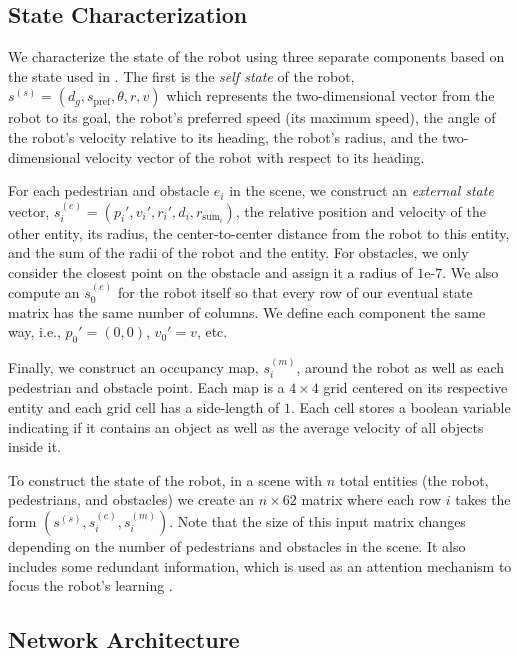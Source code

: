 \documentclass[letterpaper, 10 pt, conference]{ieeeconf}  %
\begin{document}
    \subsection{State Characterization}
    We characterize the state of the robot using three separate components based on the state used in \cite{crowdawarerl}. The first is the \textit{self state} of the robot, $s^{(s)}=(d_g, s_\text{pref}, \theta, r, v)$ which represents the two-dimensional vector from the robot to its goal, the robot's preferred speed (its maximum speed), the angle of the robot's velocity relative to its heading, the robot's radius, and the two-dimensional velocity vector of the robot with respect to its heading. 
    
    For each pedestrian and obstacle $e_i$ in the scene, we construct an \textit{external state} vector, $s_i^{(e)}=(p_i', v_i', r_i', d_i, r_{\text{sum}_i})$, the relative position and velocity of the other entity, its radius, the center-to-center distance from the robot to this entity, and the sum of the radii of the robot and the entity. For obstacles, we only consider the closest point on the obstacle and assign it a radius of $1\text{e-}7$. We also compute an $s_0^{(e)}$ for the robot itself so that every row of our eventual state matrix has the same number of columns. We define each component the same way, i.e., $p_0'=(0,0)$, $v_0'=v$, etc.
    
    Finally, we construct an occupancy map, $s_i^{(m)}$, around the robot as well as each pedestrian and obstacle point. Each map is a $4\times 4$ grid centered on its respective entity and each grid cell has a side-length of $1$. Each cell stores a boolean variable indicating if it contains an object as well as the average velocity of all objects inside it.
    
    To construct the state of the robot, in a scene with $n$ total entities (the robot, pedestrians, and obstacles) we create an $n\times62$ matrix where each row $i$ takes the form $(s^{(s)}, s_i^{(e)}, s_i^{(m)})$. Note that the size of this input matrix changes depending on the number of pedestrians and obstacles in the scene. It also includes some redundant information, which is used as an attention mechanism to focus the robot's learning \cite{crowdawarerl}.
	
	\subsection{Network Architecture}
	
\end{document}
